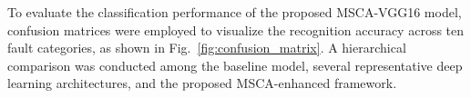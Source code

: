 \documentclass[anonymous]{iopjournal}
\begin{document}




To evaluate the classification performance of the proposed MSCA-VGG16 model, confusion matrices were employed to visualize the recognition accuracy across ten fault categories, as shown in Fig.~\ref{fig:confusion_matrix}. A hierarchical comparison was conducted among the baseline model, several representative deep learning architectures, and the proposed MSCA-enhanced framework. 
\end{document}
